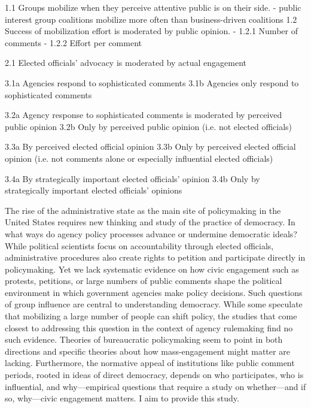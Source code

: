

1.1 Groups mobilize when they perceive attentive public is on their side.
- public interest group coalitions mobilize more often than business-driven coalitions
1.2 Success of mobilization effort is moderated by public opinion. 
- 1.2.1 Number of comments 
- 1.2.2 Effort per comment 

2.1 Elected officials' advocacy is moderated by actual engagement

3.1a Agencies respond to sophisticated comments 
3.1b Agencies only respond to sophisticated comments

3.2a Agency response to sophisticated comments is moderated by perceived public opinion
3.2b Only by perceived public opinion (i.e. not elected officials) 

3.3a By perceived elected official opinion
3.3b Only by perceived elected official opinion (i.e. not comments alone or especially influential elected officials)

3.4a By strategically important elected officials' opinion
3.4b Only by strategically important elected officials' opinions





The rise of the administrative state as the main site of policymaking in the United States requires new thinking and study of the practice of democracy. In what ways do agency policy processes advance or undermine democratic ideals? While political scientists focus on accountability through elected officials, administrative procedures also create rights to petition and participate directly in policymaking.  Yet we lack systematic evidence on how civic engagement such as protests, petitions, or large numbers of public comments shape the political environment in which government agencies make policy decisions. Such questions of group influence are central to understanding democracy. While some speculate that mobilizing a large number of people can shift policy, the studies that come closest to addressing this question in the context of agency rulemaking find no such evidence. Theories of bureaucratic policymaking seem to point in both directions and specific theories about how mass-engagement might matter are lacking. Furthermore, the normative appeal of institutions like public comment periods, rooted in ideas of direct democracy, depends on who participates, who is influential, and why---empirical questions that require a study on whether---and if so, why---civic engagement matters. I aim to provide this study.

